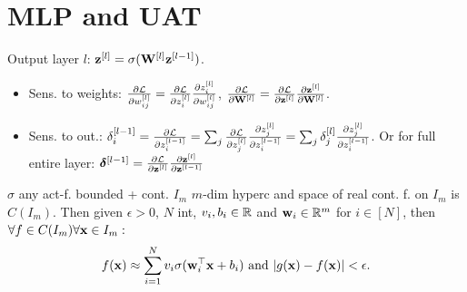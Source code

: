 \section{MLP and UAT}
Output layer \(l\): \(\vb{z}^{[l]} = \sigma(\vb{W}^{[l]} \vb{z}^{[l - 1]})\).
\begin{itemize}
    \item Sens. to weights: \(\frac{\partial \mathcal{L}}{\partial w_{ij}^{[l]}} = \frac{\partial \mathcal{L}}{\partial z_i^{[l]}} \frac{\partial z_i^{[l]} }{\partial w_{ij}^{[l]}}\), \(\frac{\partial \mathcal{L}}{\partial \vb{W}^{[l]} } = \frac{\partial \mathcal{L}}{\partial \vb{z}^{[l]} } \frac{\partial \vb{z} ^{[l]}}{\partial \vb{W} ^{[l]}}\).
    \item Sens. to out.: \(\delta_i^{[l-1]} = \frac{\partial \mathcal{L}}{\partial z_i^{[l-1]}} = \sum_j \frac{\partial \mathcal{L}}{\partial z_j^{[l]}} \frac{\partial z_j^{[l]}}{\partial z_i ^{[l-1]}} = \sum_j \delta_j^{[l]} \frac{\partial z_j^{[l]}}{\partial z_i ^{[l-1]}}\).
    Or for full entire layer: \(\vb*{\delta}^{[l-1]} = \frac{\partial \mathcal{L}}{\partial \vb{z} ^{[l]}} \frac{\partial \vb{z}^{[l]}}{\partial \vb{z} ^{[l-1]}}\)
\end{itemize}

\begin{definition}[UAT]
    \(\sigma\) any act-f. bounded + cont. \(I_m\) \(m\)-dim hyperc and space of real cont. f. on \(I_m\) is \(C(I_m)\). Then given \(\epsilon > 0\), \(N\) int, \(v_i, b_i \in \mathbb{R}\) and \(\vb{w}_i \in \mathbb{R}^m\) for \(i \in [N]\), then \(\forall f \in C(I_m) \forall \vb{x} \in I_m:\)
    \[f(\vb{x}) \approx \sum_{i=1}^N v_i \sigma(\vb{w}_i^\top \vb{x} + b_i) \ \text{and} \  \vert g(\vb{x}) - f(\vb{x})\vert < \epsilon.\]
\end{definition}


